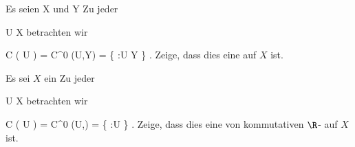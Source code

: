{}
{





Es seien
\mathkor {} {X} {und} {Y} {}
Zu jeder

\mavergleichskette
{\vergleichskette
{U
}
{ \subseteq }{ X
}
{  }{
}
{    }{
}
{   }{
}
}
{}{}{}
betrachten wir

\mavergleichskettedisp
{\vergleichskette
{ { \mathcal  C   }  \left(   U   \right)
}
{ =} { C^0 (U,Y)
}
{ =} { \left\{  \varphi:U \rightarrow Y  \mid  \varphi {}         \right\}
}
{ } {
}
{ } {
}
}
{}{}{.}
Zeige, dass dies eine
auf $X$ ist.





}
{} {}

{}
{





Es sei $X$ ein
Zu jeder

\mavergleichskette
{\vergleichskette
{U
}
{ \subseteq }{ X
}
{  }{
}
{    }{
}
{   }{
}
}
{}{}{}
betrachten wir

\mavergleichskettedisp
{\vergleichskette
{ { \mathcal  C   }  \left(   U   \right)
}
{ =} { C^0 (U,\R)
}
{ =} { \left\{  \varphi:U \rightarrow \R  \mid  \varphi {}         \right\}
}
{ } {
}
{ } {
}
}
{}{}{.}
Zeige, dass dies eine
von kommutativen
$\R$-
auf $X$ ist.





}
{} {}

